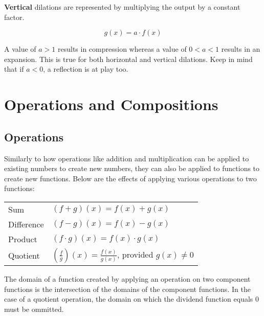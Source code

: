 \documentclass[11pt]{article}
\begin{document}
\begin{center}
\end{center}

\textbf{Vertical} dilations are represented by multiplying the output by a constant factor.

\begin{equation*}
    g(x) = a\cdot f(x)
\end{equation*}

\begin{center}
\end{center}

A value of $a > 1$ results in compression whereas a value of $0 < a < 1$ results in an expansion. This is true for both horizontal and vertical dilations. Keep in mind that if $a < 0$, a reflection is at play too.

\section{Operations and Compositions}

\subsection{Operations}
Similarly to how operations like addition and multiplication can be applied to existing numbers to create new numbers, they can also be applied to functions to create new functions. Below are the effects of applying various operations to two functions:
\renewcommand{\arraystretch}{1.25}
\begin{table}[H]
    \centering
    \begin{tabular}{p{2cm} p{10cm}}
    Sum & $(f+g)(x) = f(x) + g(x)$ \\
    Difference & $(f-g)(x) = f(x) - g(x)$ \\
    Product & $(f \cdot g)(x) = f(x) \cdot g(x)$ \\
    Quotient & $(\frac{f}{g})(x) = \frac{f(x)}{g(x)}$, provided $g(x)\neq0$\\
    \end{tabular}
\end{table}
\renewcommand{\arraystretch}{1}
The domain of a function created by applying an operation on two component functions is the intersection of the domains of the component functions. In the case of a quotient operation, the domain on which the dividend function equals 0 must be ommitted. 
\end{document}
